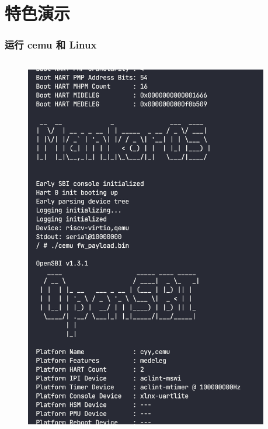 \section{特色演示}

\begin{frame}
    \frametitle{运行 cemu 和 Linux}

    \begin{columns}
        \begin{column}{.4\linewidth}
            \begin{figure}
                \centering
                \includegraphics[height=0.7\textheight]{assets/cemu1.png}
            \end{figure}
        \end{column}
        \begin{column}{.6\linewidth}

\end{column}
\end{columns}
\end{frame}
